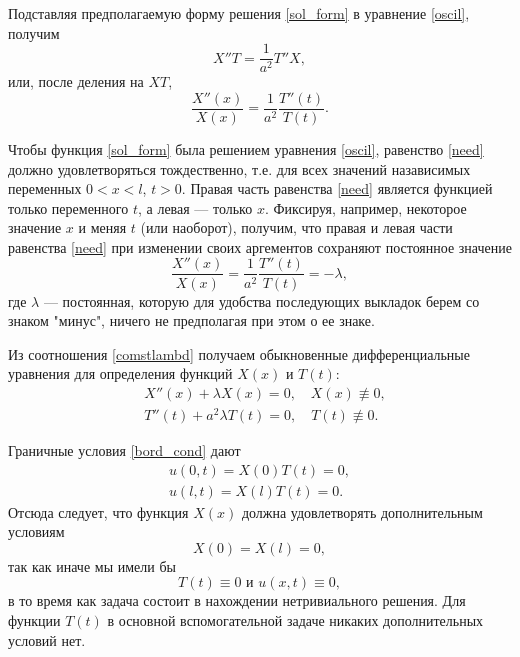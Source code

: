Подставляя предполагаемую форму решения \eqref{sol_form} в уравнение \eqref{oscil}, получим 
\begin{equation*}
	X'' T = \frac{1}{a^2} T'' X,
\end{equation*}
или, после деления на $X T$,
\begin{equation} \label{need}
	\frac{X''(x)}{X(x)} = \frac{1}{a^2} \frac{T''(t)}{T(t)}.
\end{equation}

Чтобы функция \eqref{sol_form} была решением уравнения \eqref{oscil}, равенство \eqref{need} должно удовлетворяться тождественно, т.е. для всех значений назависимых переменных $0 < x < l$, $t > 0$. Правая часть равенства \eqref{need} является функцией только переменного $t$, а левая --- только $x$. Фиксируя, например, некоторое значение $x$ и меняя $t$ (или наоборот), получим, что правая и левая части равенства \eqref{need} при изменении своих аргементов сохраняют постоянное значение
\begin{equation} \label{comstlambd}
	\frac{X''(x)}{X(x)} = \frac{1}{a^2} \frac{T''(t)}{T(t)} = -\lambda,
\end{equation}
где $\lambda$ --- постоянная, которую для удобства последующих выкладок берем со знаком "минус", ничего не предполагая при этом о ее знаке.

Из соотношения \eqref{comstlambd} получаем обыкновенные дифференциальные уравнения для определения функций $X(x)$ и $T(t)$:
\begin{align}
	&X''(x) + \lambda X(x) = 0, \quad X(x) \not \equiv 0, \\
	&T''(t) + a^2 \lambda T(t) = 0, \quad T(t) \not \equiv 0. \label{Teq}
\end{align}

Граничные условия \eqref{bord_cond} дают
\begin{align*}
	u(0, t) = X(0) T(t) = 0, \\
	u(l, t) = X(l) T(t) = 0.
\end{align*}
Отсюда следует, что функция $X(x)$ должна удовлетворять дополнительным условиям 
\begin{equation}
	X(0) = X(l) = 0,
\end{equation}
так как иначе мы имели бы
\begin{equation*}
	T(t) \equiv 0 \text{ и } u(x, t) \equiv 0,
\end{equation*}
в то время как задача состоит в нахождении нетривиального решения. Для функции $T(t)$ в основной вспомогательной задаче никаких дополнительных условий нет. 

